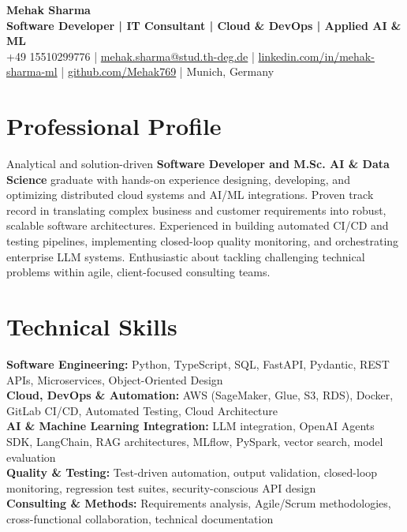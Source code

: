 \documentclass[8.5pt,a4paper]{article}
\begin{document}

\begin{center}
    {\Large\textbf{Mehak Sharma}}\\[-1pt]
    \textbf{Software Developer \;|\; IT Consultant \;|\; Cloud \& DevOps \;|\; Applied AI \& ML}\\[1pt]
    +49 15510299776 \;|\;
    \href{mailto:mehak.sharma@stud.th-deg.de}{mehak.sharma@stud.th-deg.de} \;|\;
    \href{https://linkedin.com/in/mehak-sharma-ml}{linkedin.com/in/mehak-sharma-ml} \;|\;
    \href{https://github.com/Mehak769}{github.com/Mehak769} \;|\;
    Munich, Germany
\end{center}


\section{Professional Profile}

Analytical and solution-driven \textbf{Software Developer and M.Sc. AI \& Data Science} graduate with hands-on experience designing, developing, and optimizing distributed cloud systems and AI/ML integrations. Proven track record in translating complex business and customer requirements into robust, scalable software architectures. Experienced in building automated CI/CD and testing pipelines, implementing closed-loop quality monitoring, and orchestrating enterprise LLM systems. Enthusiastic about tackling challenging technical problems within agile, client-focused consulting teams.


\section{Technical Skills}

\textbf{Software Engineering:} Python, TypeScript, SQL, FastAPI, Pydantic, REST APIs, Microservices, Object-Oriented Design\\
\textbf{Cloud, DevOps \& Automation:} AWS (SageMaker, Glue, S3, RDS), Docker, GitLab CI/CD, Automated Testing, Cloud Architecture\\
\textbf{AI \& Machine Learning Integration:} LLM integration, OpenAI Agents SDK, LangChain, RAG architectures, MLflow, PySpark, vector search, model evaluation\\
\textbf{Quality \& Testing:} Test-driven automation, output validation, closed-loop monitoring, regression test suites, security-conscious API design\\
\textbf{Consulting \& Methods:} Requirements analysis, Agile/Scrum methodologies, cross-functional collaboration, technical documentation
\end{document}
